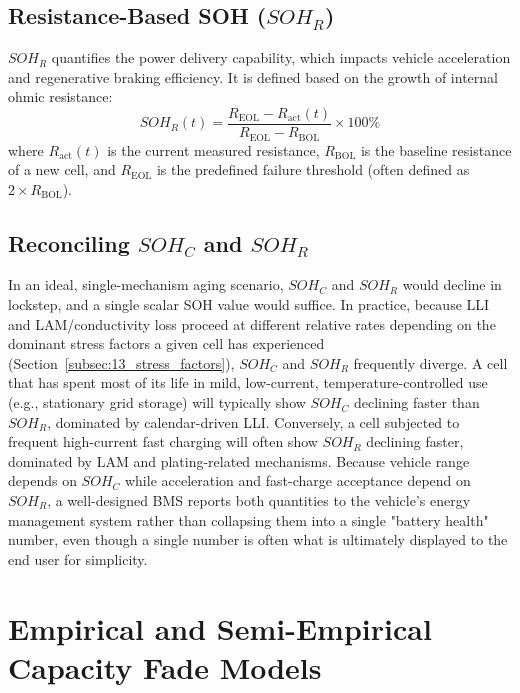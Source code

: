 \subsection{Resistance-Based SOH ($SOH_R$)}
\label{subsec:13_sohr}

$SOH_R$ quantifies the power delivery capability, which impacts vehicle acceleration and regenerative braking efficiency. It is defined based on the growth of internal ohmic resistance:
\begin{equation}
    SOH_R(t) = \frac{R_{\text{EOL}} - R_{\text{act}}(t)}{R_{\text{EOL}} - R_{\text{BOL}}} \times 100\%
    \label{eq:13_sohr}
\end{equation}
where $R_{\text{act}}(t)$ is the current measured resistance, $R_{\text{BOL}}$ is the baseline resistance of a new cell, and $R_{\text{EOL}}$ is the predefined failure threshold (often defined as $2 \times R_{\text{BOL}}$).

\subsection{Reconciling $SOH_C$ and $SOH_R$}
\label{subsec:13_reconciling}

In an ideal, single-mechanism aging scenario, $SOH_C$ and $SOH_R$ would decline in lockstep, and a single scalar SOH value would suffice. In practice, because LLI and LAM/conductivity loss proceed at different relative rates depending on the dominant stress factors a given cell has experienced (Section~\ref{subsec:13_stress_factors}), $SOH_C$ and $SOH_R$ frequently diverge. A cell that has spent most of its life in mild, low-current, temperature-controlled use (e.g., stationary grid storage) will typically show $SOH_C$ declining faster than $SOH_R$, dominated by calendar-driven LLI. Conversely, a cell subjected to frequent high-current fast charging will often show $SOH_R$ declining faster, dominated by LAM and plating-related mechanisms. Because vehicle range depends on $SOH_C$ while acceleration and fast-charge acceptance depend on $SOH_R$, a well-designed BMS reports both quantities to the vehicle's energy management system rather than collapsing them into a single "battery health" number, even though a single number is often what is ultimately displayed to the end user for simplicity.

\section{Empirical and Semi-Empirical Capacity Fade Models}
\label{sec:13_fade_models}

